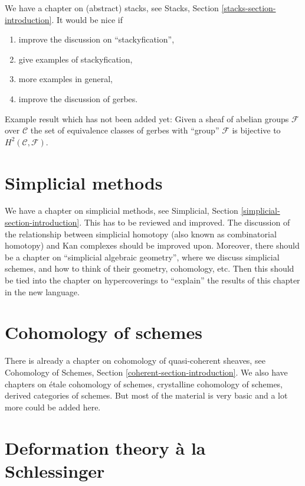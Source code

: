 \noindent
We have a chapter on (abstract) stacks, see
Stacks, Section \ref{stacks-section-introduction}.
It would be nice if
\begin{enumerate}
\item improve the discussion on ``stackyfication'',
\item give examples of stackyfication,
\item more examples in general,
\item improve the discussion of gerbes.
\end{enumerate}
Example result which has not been added yet: Given a sheaf of abelian
groups $\mathcal{F}$
over $\mathcal{C}$ the set of equivalence classes of gerbes with ``group''
$\mathcal{F}$ is bijective to $H^2(\mathcal{C}, \mathcal{F})$.


\section{Simplicial methods}
\label{section-simplicial}

\noindent
We have a chapter on simplicial methods, see
Simplicial, Section \ref{simplicial-section-introduction}.
This has to be reviewed and improved. The discussion of
the relationship between simplicial homotopy (also known as
combinatorial homotopy) and Kan complexes should be improved upon.
Moreover, there should be a
chapter on ``simplicial algebraic geometry'', where we discuss
simplicial schemes, and how to think of their geometry, cohomology,
etc. Then this should be tied into the chapter on hypercoverings
to ``explain'' the results of this chapter in the new language.


\section{Cohomology of schemes}
\label{section-schemes-cohomology}

\noindent
There is already a chapter on cohomology of quasi-coherent sheaves, see
Cohomology of Schemes, Section \ref{coherent-section-introduction}.
We also have chapters on \'etale cohomology of schemes,
crystalline cohomology of schemes, derived categories of schemes.
But most of the material is very basic and a lot more could be added here.


\section{Deformation theory \`a la Schlessinger}
\label{section-deformation-schlessinger}

